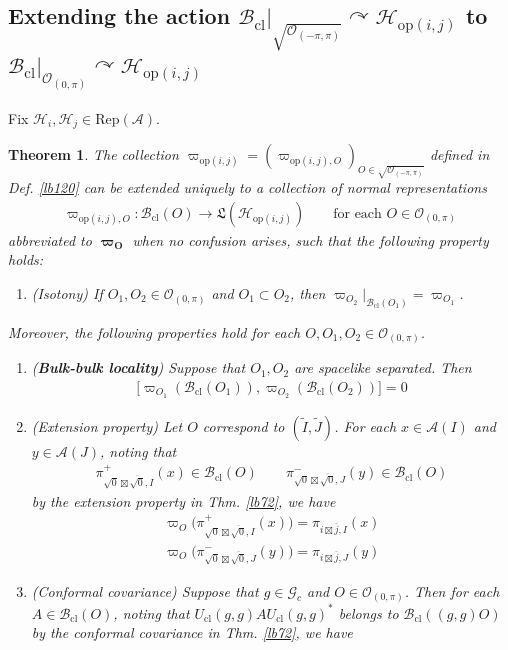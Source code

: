 \documentclass[11pt,b5paper,notitlepage]{article}
\theoremstyle{definition}
\theoremstyle{plain}
\newtheorem{thm}[df]{Theorem}
\newcommand{\fk}{\mathfrak}
\newcommand{\wtd}{\widetilde}
\newcommand{\ovl}{\overline}
\newcommand{\RepA}{\mathrm{Rep}(\mathcal A)}
\newcommand{\Gc}{\mathscr G_c}
\newcommand{\MA}{\mathcal A}
\newcommand{\MH}{\mathcal H}
\newcommand{\sqz}{{\sqrt 0}}
\newcommand{\Bcl}{\mathcal B_{\mathrm{cl}}}
\newcommand{\Ozp}{\mathcal O_{(0,\pi)}}
\newcommand{\ZOpp}{\sqrt{\mathcal O_{(-\pi,\pi)}}}
\newcommand{\Ucl}{U_{\mathrm{cl}}}
\newcommand{\Hopij}{\mathcal H_{\mathrm{op}(i,j)}}
\newcommand{\opij}{\mathrm{op}(i,j)}
\numberwithin{equation}{section}
\begin{document}
\subsection{Extending the action $\Bcl\big\vert_{\ZOpp}\curvearrowright\Hopij$ to $\Bcl\big\vert_{\Ozp}\curvearrowright\Hopij$}\label{lb154}

Fix $\MH_i,\MH_j\in\RepA$.


\begin{thm}\label{lb149}
The collection $\varpi_{\opij}=(\varpi_{\opij,O})_{O\in\ZOpp}$ defined in Def. \ref{lb120} can be extended uniquely to a collection of normal representations
\begin{align*}
\varpi_{\opij,O}:\Bcl(O)\rightarrow\fk L(\MH_{\opij})\qquad\text{for each }O\in\Ozp
\end{align*}
abbreviated to $\pmb{\varpi_O}$ when no confusion arises, such that the following property holds:
\begin{enumerate}
\item[(1)] (Isotony) If $O_1,O_2\in\Ozp$ and $O_1\subset O_2$, then $\varpi_{O_2}\big|_{\Bcl(O_1)}=\varpi_{O_1}$.
\end{enumerate}
Moreover, the following properties hold for each $O,O_1,O_2\in\Ozp$.
\begin{enumerate}[label=(\arabic*),start=2]
\item (\textbf{Bulk-bulk locality}) Suppose that $O_1,O_2$ are spacelike separated. Then
\begin{align*}
\big[\varpi_{O_1}(\Bcl(O_1)),\varpi_{O_2}(\Bcl(O_2))\big]=0
\end{align*}
\item (Extension property) Let $O$ correspond to $(\wtd I,\wtd J)$. For each $x\in\MA(I)$ and $y\in\MA(J)$, noting that
\begin{align*}
\pi^+_{\sqz\boxtimes\ovl\sqz,I}(x)\in\Bcl(O)\qquad \pi^-_{\sqz\boxtimes\ovl\sqz,J}(y)\in\Bcl(O)
\end{align*}
by the extension property in Thm. \ref{lb72}, we have
\begin{gather*}
\varpi_{O}\big(\pi^+_{\sqz\boxtimes\ovl\sqz,I}(x)\big)=\pi_{i\boxtimes \ovl j,I}(x)\\
\varpi_{O}\big(\pi^-_{\sqz\boxtimes\ovl\sqz,J}(y)\big)=\pi_{i\boxtimes \ovl j,J}(y)
\end{gather*}
\item (Conformal covariance) Suppose that $g\in\Gc$ and $O\in\Ozp$. Then for each $A\in\Bcl(O)$, noting that $\Ucl(g,g)A\Ucl(g,g)^*$ belongs to $\Bcl((g,g)O)$ by the conformal covariance in Thm. \ref{lb72}, we have

\end{enumerate}
\end{thm}
\end{document}
